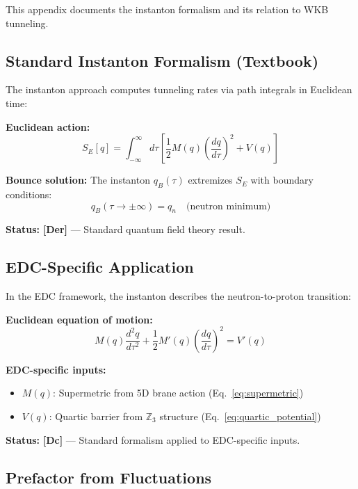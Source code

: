 \documentclass[11pt,a4paper]{article}
\newcommand{\tagDc}{\textcolor{blue!70!black}{\textbf{[Dc]}}}
\newcommand{\tagDer}{\textcolor{green!50!black}{\textbf{[Der]}}}
\begin{document}
This appendix documents the instanton formalism and its relation to WKB tunneling.

\subsection{Standard Instanton Formalism (Textbook)}

The instanton approach computes tunneling rates via path integrals in Euclidean time:

\textbf{Euclidean action:}
\begin{equation}
    S_E[q] = \int_{-\infty}^{\infty} d\tau \left[ \frac{1}{2} M(q) \left(\frac{dq}{d\tau}\right)^2 + V(q) \right]
\end{equation}

\textbf{Bounce solution:} The instanton $q_B(\tau)$ extremizes $S_E$ with boundary conditions:
\begin{equation}
    q_B(\tau \to \pm\infty) = q_n \quad \text{(neutron minimum)}
\end{equation}

\textbf{Status:} \tagDer{} --- Standard quantum field theory result.

\subsection{EDC-Specific Application}

In the EDC framework, the instanton describes the neutron-to-proton transition:

\textbf{Euclidean equation of motion:}
\begin{equation}
    M(q) \frac{d^2 q}{d\tau^2} + \frac{1}{2} M'(q) \left( \frac{dq}{d\tau} \right)^2 = V'(q)
\end{equation}

\textbf{EDC-specific inputs:}
\begin{itemize}[nosep]
    \item $M(q)$: Supermetric from 5D brane action (Eq.~\ref{eq:supermetric})
    \item $V(q)$: Quartic barrier from $\mathbb{Z}_3$ structure (Eq.~\ref{eq:quartic_potential})
\end{itemize}

\textbf{Status:} \tagDc{} --- Standard formalism applied to EDC-specific inputs.

\subsection{Prefactor from Fluctuations}
\end{document}
